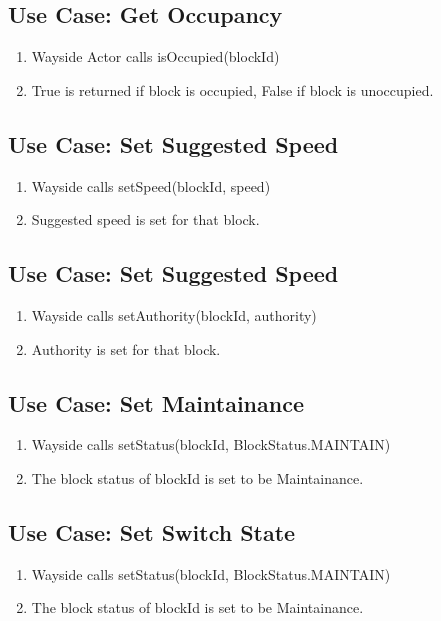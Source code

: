 \documentclass{scrreprt}
\begin{document}
\subsection{Use Case: Get Occupancy}
\begin{enumerate}
	\item Wayside Actor calls isOccupied(blockId)
	\item True is returned if block is occupied, False if block is unoccupied.
\end{enumerate}

\subsection{Use Case: Set Suggested Speed}
\begin{enumerate}
	\item Wayside calls setSpeed(blockId, speed)
	\item Suggested speed is set for that block.
\end{enumerate}

\subsection{Use Case: Set Suggested Speed}
\begin{enumerate}
	\item Wayside calls setAuthority(blockId, authority)
	\item Authority is set for that block.
\end{enumerate}

\subsection{Use Case: Set Maintainance}
\begin{enumerate}
	\item Wayside calls setStatus(blockId, BlockStatus.MAINTAIN)
	\item The block status of blockId is set to be Maintainance.
\end{enumerate}

\subsection{Use Case: Set Switch State}
\begin{enumerate}
	\item Wayside calls setStatus(blockId, BlockStatus.MAINTAIN)
	\item The block status of blockId is set to be Maintainance.
\end{enumerate}
\end{document}
